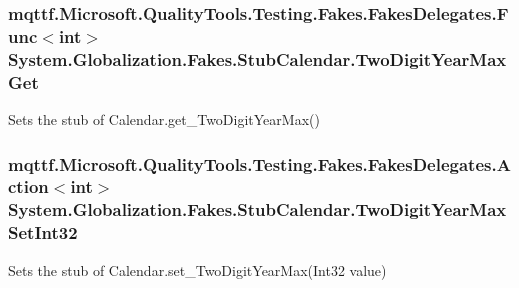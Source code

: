 \hypertarget{class_system_1_1_globalization_1_1_fakes_1_1_stub_calendar_aa5364409f91dff411cb85dd2252bedf0}{
\subsubsection[{Two\-Digit\-Year\-Max\-Get}]{\setlength{\rightskip}{0pt plus 5cm}mqttf.\-Microsoft.\-Quality\-Tools.\-Testing.\-Fakes.\-Fakes\-Delegates.\-Func$<$int$>$ System.\-Globalization.\-Fakes.\-Stub\-Calendar.\-Two\-Digit\-Year\-Max\-Get}}\label{class_system_1_1_globalization_1_1_fakes_1_1_stub_calendar_aa5364409f91dff411cb85dd2252bedf0}


Sets the stub of Calendar.\-get\-\_\-\-Two\-Digit\-Year\-Max()

\hypertarget{class_system_1_1_globalization_1_1_fakes_1_1_stub_calendar_a54a3991ee692bb10c8f7a45a1f1ae28f}{
\subsubsection[{Two\-Digit\-Year\-Max\-Set\-Int32}]{\setlength{\rightskip}{0pt plus 5cm}mqttf.\-Microsoft.\-Quality\-Tools.\-Testing.\-Fakes.\-Fakes\-Delegates.\-Action$<$int$>$ System.\-Globalization.\-Fakes.\-Stub\-Calendar.\-Two\-Digit\-Year\-Max\-Set\-Int32}}\label{class_system_1_1_globalization_1_1_fakes_1_1_stub_calendar_a54a3991ee692bb10c8f7a45a1f1ae28f}


Sets the stub of Calendar.\-set\-\_\-\-Two\-Digit\-Year\-Max(\-Int32 value)



